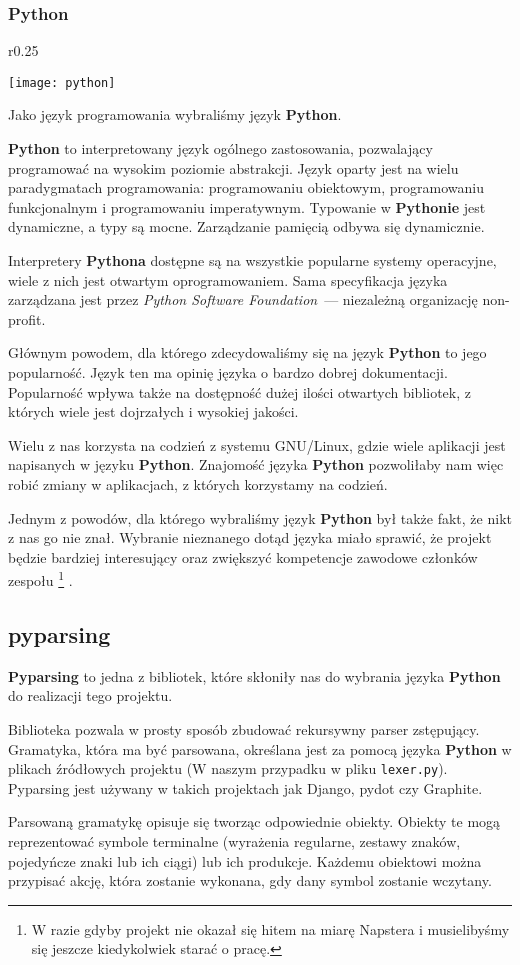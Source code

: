 \subsubsection{Python}

\begin{wrapfigure}{r}{0.25\textwidth}
  \begin{center}
    \texttt{[image: python]}
  \end{center}
\end{wrapfigure}
Jako język programowania wybraliśmy język \textbf{Python}.

\textbf{Python} to interpretowany język ogólnego zastosowania, pozwalający programować na wysokim poziomie abstrakcji.
Język oparty jest na wielu paradygmatach programowania: programowaniu obiektowym, programowaniu funkcjonalnym i programowaniu imperatywnym.
Typowanie w \textbf{Pythonie} jest dynamiczne, a typy są mocne.
Zarządzanie pamięcią odbywa się dynamicznie.

Interpretery \textbf{Pythona} dostępne są na wszystkie popularne systemy operacyjne, wiele z nich jest otwartym oprogramowaniem.
Sama specyfikacja języka zarządzana jest przez \emph{Python Software Foundation}~--- niezależną organizację non-profit.

Głównym powodem, dla którego zdecydowaliśmy się na język \textbf{Python} to jego popularność.
Język ten ma opinię języka o bardzo dobrej dokumentacji.
Popularność wpływa także na dostępność dużej ilości otwartych bibliotek, z których wiele jest dojrzałych i wysokiej jakości.

Wielu z nas korzysta na codzień z systemu GNU/Linux, gdzie wiele aplikacji jest napisanych w języku \textbf{Python}.
Znajomość języka \textbf{Python} pozwoliłaby nam więc robić zmiany w aplikacjach, z których korzystamy na codzień.

Jednym z powodów, dla którego wybraliśmy język \textbf{Python} był także fakt, że nikt z nas go nie znał.
Wybranie nieznanego dotąd języka miało sprawić, że projekt będzie bardziej interesujący oraz zwiększyć kompetencje zawodowe członków zespołu
\footnote{W razie gdyby projekt nie okazał się hitem na miarę Napstera i musielibyśmy się jeszcze kiedykolwiek starać o pracę.}
.

\subsection{pyparsing}
\textbf{Pyparsing} to jedna z bibliotek, które skłoniły nas do wybrania języka \textbf{Python} do realizacji tego projektu.

Biblioteka pozwala w prosty sposób zbudować rekursywny parser zstępujący.
Gramatyka, która ma być parsowana, określana jest za pomocą języka \textbf{Python} w plikach źródłowych projektu (W naszym przypadku w pliku \texttt{lexer.py}).
Pyparsing jest używany w takich projektach jak Django, pydot czy Graphite.

Parsowaną gramatykę opisuje się tworząc odpowiednie obiekty.
Obiekty te mogą reprezentować symbole terminalne (wyrażenia regularne, zestawy znaków, pojedyńcze znaki lub ich ciągi) lub ich produkcje.
Każdemu obiektowi można przypisać akcję, która zostanie wykonana, gdy dany symbol zostanie wczytany.
